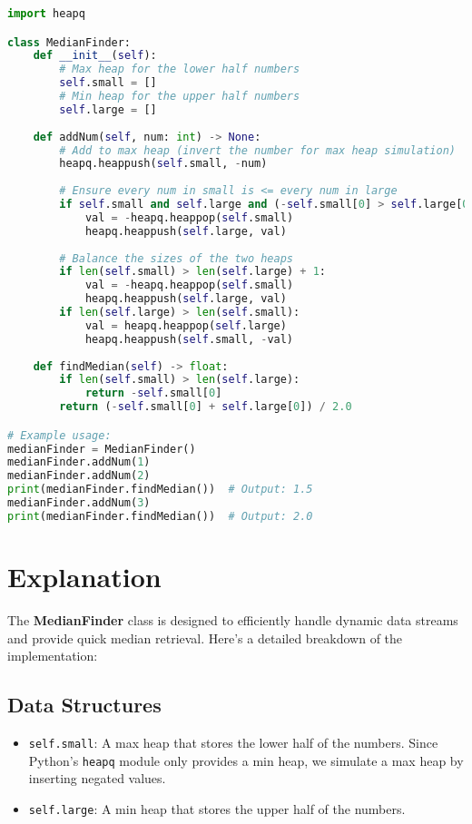 \begin{fullwidth}
\begin{lstlisting}[language=Python]
import heapq

class MedianFinder:
    def __init__(self):
        # Max heap for the lower half numbers
        self.small = []
        # Min heap for the upper half numbers
        self.large = []
    
    def addNum(self, num: int) -> None:
        # Add to max heap (invert the number for max heap simulation)
        heapq.heappush(self.small, -num)
        
        # Ensure every num in small is <= every num in large
        if self.small and self.large and (-self.small[0] > self.large[0]):
            val = -heapq.heappop(self.small)
            heapq.heappush(self.large, val)
        
        # Balance the sizes of the two heaps
        if len(self.small) > len(self.large) + 1:
            val = -heapq.heappop(self.small)
            heapq.heappush(self.large, val)
        if len(self.large) > len(self.small):
            val = heapq.heappop(self.large)
            heapq.heappush(self.small, -val)
    
    def findMedian(self) -> float:
        if len(self.small) > len(self.large):
            return -self.small[0]
        return (-self.small[0] + self.large[0]) / 2.0

# Example usage:
medianFinder = MedianFinder()
medianFinder.addNum(1)
medianFinder.addNum(2)
print(medianFinder.findMedian())  # Output: 1.5
medianFinder.addNum(3)
print(medianFinder.findMedian())  # Output: 2.0
\end{lstlisting}
\end{fullwidth}

\section*{Explanation}

The \textbf{MedianFinder} class is designed to efficiently handle dynamic data streams and provide quick median retrieval. Here's a detailed breakdown of the implementation:

\subsection*{Data Structures}
\begin{itemize}
    \item \texttt{self.small}: A max heap that stores the lower half of the numbers. Since Python's \texttt{heapq} module only provides a min heap, we simulate a max heap by inserting negated values.
    \item \texttt{self.large}: A min heap that stores the upper half of the numbers.
\end{itemize}

